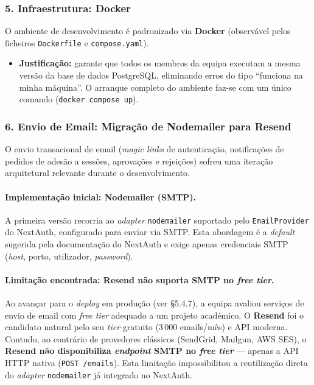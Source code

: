 \documentclass[11pt,a4paper]{article}
\begin{document}
\subsubsection{5. Infraestrutura: Docker}

O ambiente de desenvolvimento é padronizado via \textbf{Docker} (observável
pelos ficheiros \texttt{Dockerfile} e \texttt{compose.yaml}).

\begin{itemize}[leftmargin=*]
    \item \textbf{Justificação:} garante que todos os membros da equipa executam
          a mesma versão da base de dados PostgreSQL, eliminando erros do tipo
          ``funciona na minha máquina''. O arranque completo do ambiente faz-se
          com um único comando (\texttt{docker compose up}).
\end{itemize}

\subsubsection{6. Envio de Email: Migração de Nodemailer para Resend}\label{sec:resend}

O envio transacional de email (\emph{magic links} de autenticação, notificações
de pedidos de adesão a sessões, aprovações e rejeições) sofreu uma iteração
arquitetural relevante durante o desenvolvimento.

\paragraph{Implementação inicial: Nodemailer (SMTP).}
A primeira versão recorria ao \emph{adapter} \texttt{nodemailer} suportado pelo
\texttt{EmailProvider} do NextAuth, configurado para enviar via SMTP. Esta
abordagem é a \emph{default} sugerida pela documentação do NextAuth e exige
apenas credenciais SMTP (\emph{host}, porto, utilizador, \emph{password}).

\paragraph{Limitação encontrada: Resend não suporta SMTP no \emph{free tier}.}
Ao avançar para o \emph{deploy} em produção (ver \S5.4.7), a equipa avaliou
serviços de envio de email com \emph{free tier} adequado a um projeto académico.
O \textbf{Resend} foi o candidato natural pelo seu \emph{tier} gratuito
(3\,000 emails/mês) e API moderna. Contudo, ao contrário de provedores
clássicos (SendGrid, Mailgun, AWS SES), o \textbf{Resend não disponibiliza
\emph{endpoint} SMTP no \emph{free tier}} --- apenas a API HTTP nativa
(\texttt{POST /emails}). Esta limitação impossibilitou a reutilização direta do
\emph{adapter} \texttt{nodemailer} já integrado no NextAuth.
\end{document}
